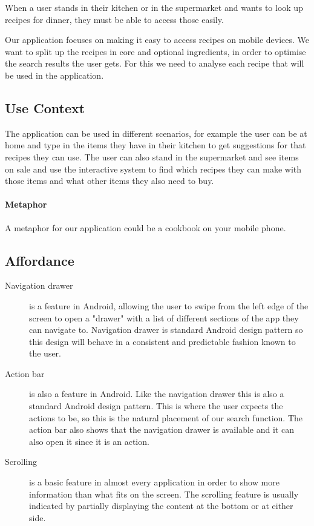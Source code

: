 When a user stands in their kitchen or in the supermarket and wants to look up recipes for dinner, they must be able to access those easily.

Our application focuses on making it easy to access recipes on mobile devices. We want to split up the recipes in core and optional ingredients, in order to optimise the search results the user gets. For this we need to analyse each recipe that will be used in the application.

\subsection*{Use Context}

The application can be used in different scenarios, for example the user can be at home and type in the items they have in their kitchen to get suggestions for that recipes they can use. The user can also stand in the supermarket and see items on sale and use the interactive system to find which recipes they can make with those items and what other items they also need to buy.

\paragraph{Metaphor}

A metaphor for our application could be a cookbook on your mobile phone. 

\subsection*{Affordance}

\begin{description}

\item [Navigation drawer] is a feature in Android, allowing the user to swipe from the left edge of the screen to open a "drawer" with a list of different sections of the app they can navigate to. Navigation drawer is standard Android design pattern so this design will behave in a consistent and predictable fashion known to the user.
\item [Action bar] is also a feature in Android. Like the navigation drawer this is also a standard Android design pattern. This is where the user expects the actions to be, so this is the natural placement of our search function. The action bar also shows that the navigation drawer is available and it can also open it since it is an action. 
\item[Scrolling] is a basic feature in almost every application in order to show more information than what fits on the screen. The scrolling feature is usually indicated by partially displaying the content at the bottom or at either side.

\end{description}

